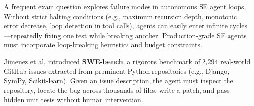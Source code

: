 \documentclass[../../main.tex]{subfiles}
\begin{document}
\begin{examinsight}
A frequent exam question explores failure modes in autonomous SE agent loops.
Without strict halting conditions (e.g., maximum recursion depth, monotonic error decrease, loop detection in tool calls), agents can easily enter infinite cycles—repeatedly fixing one test while breaking another. Production-grade SE agents must incorporate loop-breaking heuristics and budget constraints.
\end{examinsight}

\begin{deepdive}
Jimenez et al. \citep{jimenez2024swebench} introduced \textbf{SWE-bench}, a rigorous benchmark of 2,294 real-world GitHub issues extracted from prominent Python repositories (e.g., Django, SymPy, Scikit-learn). Given an issue description, the agent must inspect the repository, locate the bug across thousands of files, write a patch, and pass hidden unit tests without human intervention.
\end{deepdive}
\end{document}
